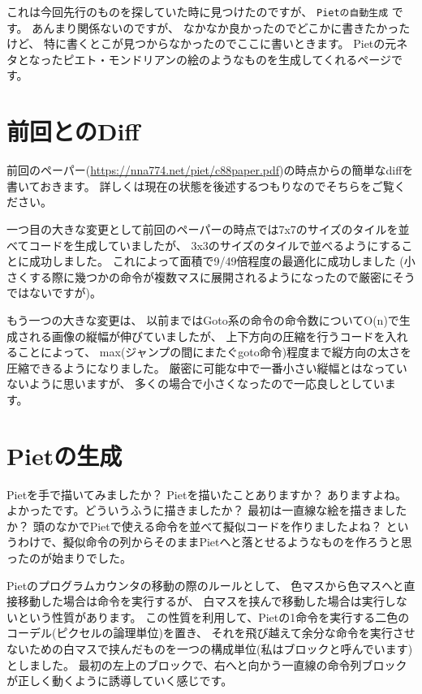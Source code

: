 これは今回先行のものを探していた時に見つけたのですが、
\texttt{Pietの自動生成} です。 あんまり関係ないのですが、
なかなか良かったのでどこかに書きたかったけど、
特に書くとこが見つからなかったのでここに書いときます。
Pietの元ネタとなったピエト・モンドリアンの絵のようなものを生成してくれるページです。

\section{前回とのDiff}

前回のペーパー(\url{https://nna774.net/piet/c88paper.pdf})の時点からの簡単なdiffを書いておきます。
詳しくは現在の状態を後述するつもりなのでそちらをご覧ください。

一つ目の大きな変更として前回のペーパーの時点では7x7のサイズのタイルを並べてコードを生成していましたが、
3x3のサイズのタイルで並べるようにすることに成功しました。
これによって面積で9/49倍程度の最適化に成功しました
(小さくする際に幾つかの命令が複数マスに展開されるようになったので厳密にそうではないですが)。

もう一つの大きな変更は、
以前まではGoto系の命令の命令数についてO(n)で生成される画像の縦幅が伸びていましたが、
上下方向の圧縮を行うコードを入れることによって、
max(ジャンプの間にまたぐgoto命令)程度まで縦方向の太さを圧縮できるようになりました。
厳密に可能な中で一番小さい縦幅とはなっていないように思いますが、
多くの場合で小さくなったので一応良しとしています。

\section{Pietの生成}

Pietを手で描いてみましたか？ Pietを描いたことありますか？ ありますよね。
よかったです。どういうふうに描きましたか？
最初は一直線な絵を描きましたか？
頭のなかでPietで使える命令を並べて擬似コードを作りましたよね？
というわけで、擬似命令の列からそのままPietへと落とせるようなものを作ろうと思ったのが始まりでした。

Pietのプログラムカウンタの移動の際のルールとして、
色マスから色マスへと直接移動した場合は命令を実行するが、
白マスを挟んで移動した場合は実行しないという性質があります。
この性質を利用して、Pietの1命令を実行する二色のコーデル(ピクセルの論理単位)を置き、
それを飛び越えて余分な命令を実行させないための白マスで挟んだものを一つの構成単位(私はブロックと呼んでいます)としました。
最初の左上のブロックで、右へと向かう一直線の命令列ブロックが正しく動くように誘導していく感じです。

